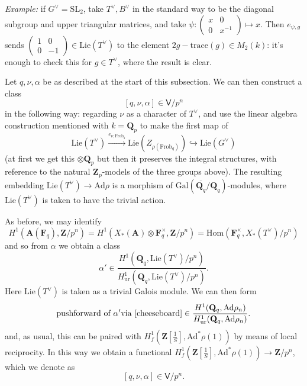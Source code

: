 \documentclass[10pt]{amsart}
\newcommand{\Z}{\mathbf{Z}}
\newcommand{\Gal}{\mathrm{Gal}}
\newcommand{\Ad}{\mathrm{Ad}}
\newcommand{\Hom}{\mathrm{Hom}}
\newcommand{\Lie}{\mathrm{Lie}}
\newcommand{\ur}{\mathrm{ur}}
\newcommand{\Frob}{\mathrm{Frob}}
\newcommand{\SL}{\mathrm{SL}}
\newcommand{\Vinf}{\mathsf{V}}
\newcommand{\Q}{\mathbf{Q}}
\theoremstyle{remark}
\newcommand{\F}{\mathbf{F}}
\begin{document}
{\em Example:}   if $G^{\vee}=\SL_2$, take $T^{\vee}, B^{\vee}$ in the standard way to be the diagonal subgroup and upper triangular matrices, and take $\psi: \left( \begin{array}{cc} x & 0 \\ 0 & x^{-1} \end{array} \right) \mapsto x$.  Then $e_{\psi, g}$ sends $  \left( \begin{array}{cc} 1 & 0 \\ 0 & -1 \end{array} \right) \in \Lie(T^{\vee})$ 
to the element  $  2g - \mathrm{trace}(g) \in M_2(k)$: it's enough to check this for $g \in T^{\vee}$, where the result is clear. 



\medskip

Let $q, \nu, \alpha$ be as described at the start of this subsection. We can then construct a class 
  $$ [q, \nu, \alpha] \in \Vinf/p^n$$
  in the following way:  regarding $\nu$ as a character of
  $T^{\vee}$,  and use the linear algebra construction mentioned with $k = \Q_p$ to make the first map of   \begin{equation} \label{cheeseboard} \mathrm{Lie}(T^{\vee}) \stackrel{e_{\nu, \Frob_q}}{\longrightarrow } \Lie(Z_{\rho(\Frob_q)}) \hookrightarrow \Lie(G^{\vee})\end{equation}
  (at first we get this $\otimes \Q_p$ but then it preserves the integral structures, with reference to the natural $\Z_p$-models of the three groups above). 
  The resulting embedding $\mathrm{Lie}(T^{\vee}) \rightarrow  \Ad \rho$
    is a morphism of $\Gal(\overline{\Q_q}/\Q_q)$-modules,
  where $\mathrm{Lie}(T^{\vee})$ is taken to have the trivial action. 
 
  
As before, we may identify
  $$H^1(\mathbf{A}(\F_q), \Z/p^n) = H^1(X_*(\mathbf{A}) \otimes \F_q^{\times} , \Z/p^n) = \Hom(\F_q^{\times}, X_*(T^{\vee}) /p^n)$$
and so from $\alpha$ we obtain a class  
$$\alpha' \in   \frac{ H^1(\Q_q, \Lie(T^{\vee})/p^n)}{H^1_{\ur}(\Q_q, \Lie(T^{\vee})/p^n)}.$$
   Here $\Lie(T^{\vee})$ is taken as a trivial Galois module.
We can then form 
$$\mbox{pushforward of } \alpha' \mbox{via \eqref{cheeseboard}}  \in   \frac{ H^1(\Q_q, \Ad \rho_n)}{H^1_{\ur}(\Q_q, \Ad \rho_n)}. $$ 
  and, as usual, this can be paired with  $H^1_f(\Z[\frac{1}{S}], \Ad^* \rho (1))$ by means of local reciprocity.
  In this way we obtain a functional $H^1_f(\Z[\frac{1}{S}], \Ad^* \rho (1)) \rightarrow \Z/p^n$, which we denote as
$$[q, \nu, \alpha] \in \Vinf/p^n.$$ 
  
\end{document}
